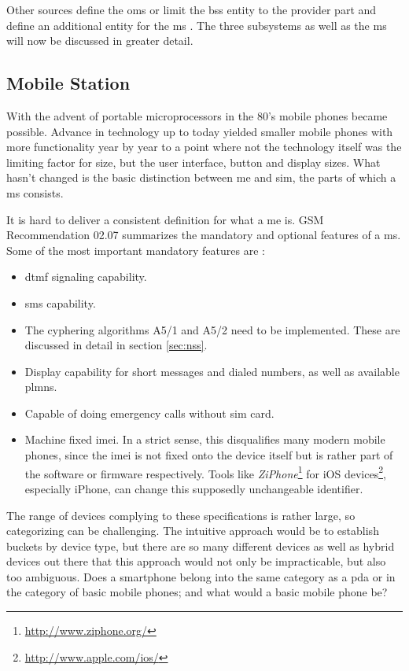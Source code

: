 Other sources define the \gls{oms} \cite{GSM2009} or limit the \gls{bss} entity to the provider part and define an additional entity for the \gls{ms} \cite{overview1994, overview1996}.
The three subsystems as well as the \gls{ms} will now be discussed in greater detail.

\subsection{Mobile Station}
\label{sec:ms}
With the advent of portable microprocessors in the 80's mobile phones became possible.
Advance in technology up to today yielded smaller mobile phones with more functionality year by year to a point where not the technology itself was the limiting factor for size, but the user interface, \eg button and display sizes.
What hasn't changed is the basic distinction between \gls{me} and \gls{sim}, the parts of which a \gls{ms} consists.

It is hard to deliver a consistent definition for what a \gls{me} is.
GSM Recommendation 02.07 \cite{GSM0207} summarizes the mandatory and optional features of a \gls{ms}.
Some of the most important mandatory features are \cite{protocols1999}:
\begin{itemize}
	\item \gls{dtmf} signaling capability.
	\item \gls{sms} capability.
	\item The cyphering algorithms A5/1 and A5/2 need to be implemented. 
	These are discussed in detail in section \ref{sec:nss}.
	\item Display capability for short messages and dialed numbers, as well as available \gls{plmn}s.
	\item Capable of doing emergency calls without \gls{sim} card.
	\item Machine fixed \gls{imei}.
	In a strict sense, this disqualifies many modern mobile phones, since the \gls{imei} is not fixed onto the device itself but is rather part of the software or firmware respectively.
	Tools like \emph{ZiPhone}\footnote{\url{http://www.ziphone.org/}} for iOS devices\footnote{\url{http://www.apple.com/ios/}}, especially iPhone, can change this supposedly unchangeable identifier.
\end{itemize}

The range of devices complying to these specifications is rather large, so categorizing can be challenging.
The intuitive approach would be to establish buckets by device type, but there are so many different devices as well as hybrid devices out there that this approach would not only be impracticable, but also too ambiguous.
Does a smartphone belong into the same category as a \gls{pda} or in the category of basic mobile phones; and what would a basic mobile phone be?

